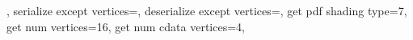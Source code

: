 {{						{\expandafter\pgfplotspointpatchvertex\pgfplotspatchclass@tensor@D\endvertex}%
		\pgfpathcurveto	{\expandafter\pgfplotspointpatchvertex\pgfplotspatchclass@tensor@E\endvertex}%
						{\expandafter\pgfplotspointpatchvertex\pgfplotspatchclass@tensor@F\endvertex}%
						{\expandafter\pgfplotspointpatchvertex\pgfplotspatchclass@tensor@G\endvertex}%
		\pgfpathcurveto	{\expandafter\pgfplotspointpatchvertex\pgfplotspatchclass@tensor@H\endvertex}%
						{\expandafter\pgfplotspointpatchvertex\pgfplotspatchclass@tensor@I\endvertex}%
						{\expandafter\pgfplotspointpatchvertex\pgfplotspatchclass@tensor@J\endvertex}%
		\pgfpathcurveto	{\expandafter\pgfplotspointpatchvertex\pgfplotspatchclass@tensor@K\endvertex}%
						{\expandafter\pgfplotspointpatchvertex\pgfplotspatchclass@tensor@L\endvertex}%
						{\expandafter\pgfplotspointpatchvertex\pgfplotspatchclass@tensor@A\endvertex}%
		\pgfpathclose
	},
	serialize except vertices=\let\pgfplotsretval\pgfutil@empty,%
	deserialize except vertices=,
	get pdf shading type=7,
	get num vertices=16,
	get num cdata vertices=4,
}%

